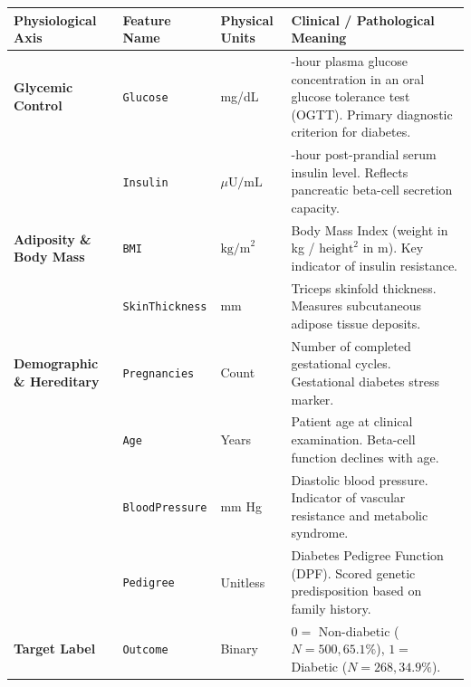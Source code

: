 \documentclass[10pt,a4paper]{article}
\begin{document}
\begin{longtable}[]{@{}
  >{\raggedright\arraybackslash}p{}
  >{\raggedright\arraybackslash}p{}
  >{\centering\arraybackslash}p{}
  >{\raggedright\arraybackslash}p{}@{}}
\toprule\noalign{}
\begin{minipage}[b]{\linewidth}\raggedright
Physiological Axis
\end{minipage} & \begin{minipage}[b]{\linewidth}\raggedright
Feature Name
\end{minipage} & \begin{minipage}[b]{\linewidth}\centering
Physical Units
\end{minipage} & \begin{minipage}[b]{\linewidth}\raggedright
Clinical / Pathological Meaning
\end{minipage} \\
\midrule\noalign{}
\endhead
\bottomrule\noalign{}
\endlastfoot
\textbf{Glycemic Control} & \texttt{Glucose} & mg/dL & 2-hour plasma
glucose concentration in an oral glucose tolerance test (OGTT). Primary
diagnostic criterion for diabetes. \\
& \texttt{Insulin} & \(\mu\text{U/mL}\) & 2-hour post-prandial serum
insulin level. Reflects pancreatic beta-cell secretion capacity. \\
\textbf{Adiposity \& Body Mass} & \texttt{BMI} & \(\text{kg/m}^2\) &
Body Mass Index (weight in kg / \(\text{height}^2\) in m). Key indicator
of insulin resistance. \\
& \texttt{SkinThickness} & mm & Triceps skinfold thickness. Measures
subcutaneous adipose tissue deposits. \\
\textbf{Demographic \& Hereditary} & \texttt{Pregnancies} & Count &
Number of completed gestational cycles. Gestational diabetes stress
marker. \\
& \texttt{Age} & Years & Patient age at clinical examination. Beta-cell
function declines with age. \\
& \texttt{BloodPressure} & mm Hg & Diastolic blood pressure. Indicator
of vascular resistance and metabolic syndrome. \\
& \texttt{Pedigree} & Unitless & Diabetes Pedigree Function (DPF).
Scored genetic predisposition based on family history. \\
\textbf{Target Label} & \texttt{Outcome} & Binary & \(0 =\) Non-diabetic
(\(N=500, 65.1\%\)), \(1 =\) Diabetic (\(N=268, 34.9\%\)). \\
\end{longtable}
\end{document}
